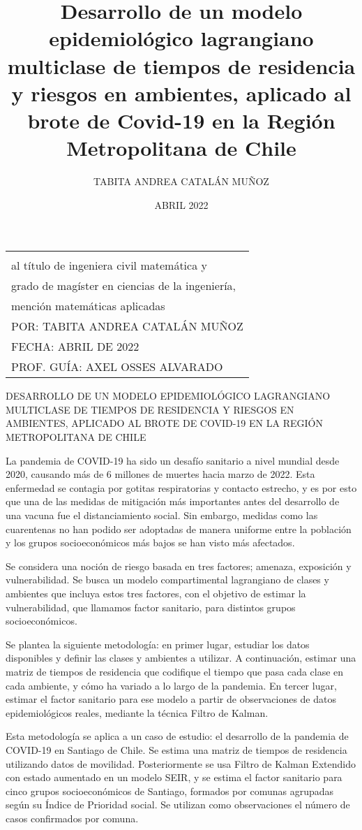\documentclass[upright, contnum]{umemoria}
\author{TABITA ANDREA CATALÁN MUÑOZ}
\title{Desarrollo de un modelo epidemiológico lagrangiano multiclase de tiempos de residencia y riesgos en ambientes, aplicado al brote de Covid-19 en la Región Metropolitana de Chile}
\date{ABRIL 2022}
\def\tablaresumen {
\begin{tabular}{l}
	\MakeUppercase{RESUMEN DE LA MEMORIA PARA OPTAR \\
	al título de ingeniera civil matemática y \\
	grado de magíster en ciencias de la ingeniería,\\
	mención matemáticas aplicadas}\\
	POR: \MakeUppercase{Tabita Andrea Catalán Muñoz} \\
	FECHA: \MakeUppercase{Abril de 2022} \\
	PROF. GUÍA: \MakeUppercase{Axel Osses Alvarado}
\end{tabular}
}
\begin{document}
\frontmatter
\maketitle

\cleardoublepage
\begin{flushleft}
	\small
	\tablaresumen
\end{flushleft}

\begin{center}
	\MakeUppercase{Desarrollo de un modelo epidemiológico lagrangiano multiclase de tiempos de residencia y riesgos en ambientes, aplicado al brote de Covid-19 en la Región Metropolitana de Chile}
\end{center}

La pandemia de COVID-19 ha sido un desafío sanitario a nivel mundial desde 2020, causando más de 6 millones de muertes hacia marzo de 2022. Esta enfermedad se contagia por gotitas respiratorias y contacto estrecho, y es por esto que una de las medidas de mitigación más importantes antes del desarrollo de una vacuna fue el distanciamiento social. Sin embargo, medidas como las cuarentenas no han podido ser adoptadas de manera uniforme entre la población y los grupos socioeconómicos más bajos se han visto más afectados.

Se considera una noción de riesgo basada en tres factores; amenaza, exposición y vulnerabilidad. Se busca un modelo compartimental lagrangiano de clases y ambientes que incluya estos tres factores, con el objetivo de estimar la vulnerabilidad, que llamamos factor sanitario, para distintos grupos socioeconómicos.

Se plantea la siguiente metodología: en primer lugar, estudiar los datos disponibles y definir las clases y ambientes a utilizar. A continuación, estimar una matriz de tiempos de residencia que codifique el tiempo que pasa cada clase en cada ambiente, y cómo ha variado a lo largo de la pandemia. En tercer lugar, estimar el factor sanitario para ese modelo a partir de observaciones de datos epidemiológicos reales, mediante la técnica Filtro de Kalman.

Esta metodología se aplica a un caso de estudio: el desarrollo de la pandemia de COVID-19 en Santiago de Chile. Se estima una matriz de tiempos de residencia utilizando datos de movilidad. Posteriormente se usa Filtro de Kalman Extendido con estado aumentado en un modelo SEIR, y se estima el factor sanitario para cinco grupos socioeconómicos de Santiago, formados por comunas agrupadas según su Índice de Prioridad social. Se utilizan como observaciones el número de casos confirmados por comuna. %
\end{document}
